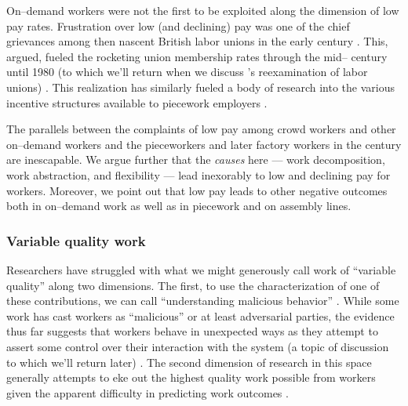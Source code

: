 \documentclass[trackingWork]{subfiles}
\begin{document}
{\begin{appendices}
    On--demand workers were not the first to be exploited along the dimension of low pay rates.
    Frustration over low (and declining) pay was one of the chief grievances among then nascent
    British labor unions in the early  century
    \cite{turner1952trade}.
    This, \citeauthor{ebbinghaus1999institutions} argued,
    fueled the rocketing union membership rates through the mid-- century until 1980
    (to which we'll return when we discuss \citeauthor{levi2009union}'s reexamination of labor unions)
    \cite{ebbinghaus1999institutions,levi2009union}.
    This realization has similarly fueled a body of research into
    the various incentive structures available to piecework employers
    \cite{roy1953work}.


    The parallels between the complaints of low pay among crowd workers and other on--demand workers
    and the pieceworkers and later factory workers in the  century
    are inescapable.
    We argue further that the \textit{causes} here
    --- work decomposition,
    work abstraction, and
    flexibility ---
    lead inexorably to low and declining pay for workers.
    Moreover, we point out that low pay leads to other negative outcomes both
    in on--demand work
    as well as
    in piecework and on assembly lines.

    \subsubsection{Variable quality work}\label{sec:varQualWork}
    Researchers have struggled with what we might generously call work of ``variable quality''
    along two dimensions.
    The first, to use the characterization of one of these contributions, we can call
    ``understanding malicious behavior''
    \cite{MaliciousCrowdworkersGadiraju}.
    While some work has cast workers as ``malicious'' or at least adversarial parties,
    the evidence thus far suggests that
    workers behave in unexpected ways as they attempt to assert some control over their interaction with the system
    (a topic of discussion to which we'll return later)
    \cite{uberAlgorithm}.
    The second dimension of research in this space generally attempts
    to eke out the highest quality work possible from workers
    given the apparent difficulty in predicting work outcomes
    \cite{embracingErrorKrishna}.






\end{appendices}}
\end{document}
